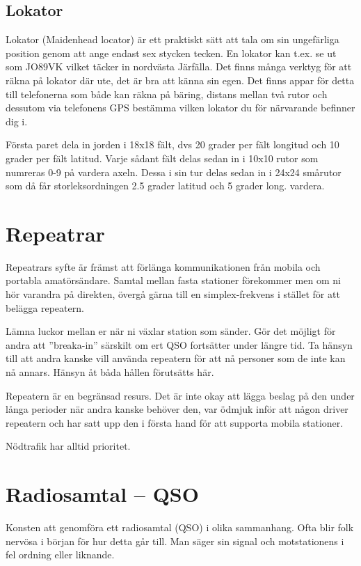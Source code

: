 \subsection{Lokator}\label{sec:lokator}

Lokator (Maidenhead locator) är ett praktiskt sätt att tala om sin ungefärliga
position genom att ange endast sex stycken tecken. En lokator kan t.ex. se ut
som JO89VK vilket täcker in nordvästa Järfälla. Det finns många verktyg för att
räkna på lokator där ute, det är bra att känna sin egen. Det finns appar för
detta till telefonerna som både kan räkna på bäring, distans mellan två rutor
och dessutom via telefonens GPS bestämma vilken lokator du för närvarande
befinner dig i.

Första paret dela in jorden i 18x18 fält, dvs 20 grader per fält longitud och 10
grader per fält latitud. Varje sådant fält delas sedan in i 10x10 rutor som
numreras 0-9 på vardera axeln. Dessa i sin tur delas sedan in i 24x24 smårutor
som då får storleksordningen 2.5 grader latitud och 5 grader long. vardera.



\section{Repeatrar}

Repeatrars syfte är främst att förlänga kommunikationen från mobila och portabla
amatörsändare. Samtal mellan fasta stationer förekommer men om ni hör varandra
på direkten, övergå gärna till en simplex-frekvens i stället för att belägga
repeatern.

Lämna luckor mellan er när ni växlar station som sänder. Gör det möjligt för
andra att ''breaka-in'' särskilt om ert QSO fortsätter under längre tid. Ta
hänsyn till att andra kanske vill använda repeatern för att nå personer som de
inte kan nå annars. Hänsyn åt båda hållen förutsätts här.

Repeatern är en begränsad resurs. Det är inte okay att lägga beslag på den under
långa perioder när andra kanske behöver den, var ödmjuk inför att någon driver
repeatern och har satt upp den i första hand för att supporta mobila stationer.

Nödtrafik har alltid prioritet.

\section{Radiosamtal -- QSO}

Konsten att genomföra ett radiosamtal (QSO) i olika sammanhang. Ofta blir folk
nervösa i början för hur detta går till. Man säger sin signal och motstationens
i fel ordning eller liknande.

